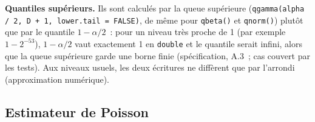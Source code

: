 \documentclass[a4paper,11pt]{article}
\newcommand{\code}[1]{\texttt{\small #1}}
\begin{document}
\medskip
\textbf{Quantiles supérieurs.} Ils sont calculés par la queue supérieure
(\code{qgamma(alpha / 2, D + 1, lower.tail = FALSE)}, de même pour
\code{qbeta()} et \code{qnorm()}) plutôt que par le quantile $1 - \alpha/2$~:
pour un niveau très proche de 1 (par exemple $1 - 2^{-53}$), $1 - \alpha/2$
vaut exactement 1 en \code{double} et le quantile serait infini, alors que la
queue supérieure garde une borne finie (spécification, A.3~; cas couvert par
les tests). Aux niveaux usuels, les deux écritures ne diffèrent que par
l'arrondi (approximation numérique).

\subsection{Estimateur de Poisson}
\label{sec:brut-poisson}
\end{document}
